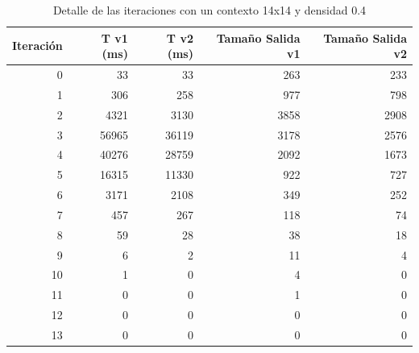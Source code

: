 	\begin{table}[h]
		\caption{Detalle de las iteraciones con un contexto 14x14 y densidad 0.4}
		\begin{center}
			\begin{tabular}{|r|r|r|r|r|}
				\hline
				Iteración  & T v1 (ms) & T v2 (ms) & Tamaño Salida v1  & Tamaño Salida v2  \\ \hline \hline
				0 & 33 & 33 & 263 & 233 \\ \hline
				1 & 306 & 258 & 977 & 798 \\ \hline
				2 & 4321 & 3130 & 3858 & 2908 \\ \hline
				3 & 56965 & 36119 & 3178 & 2576 \\ \hline
				4 & 40276 & 28759 & 2092 & 1673 \\ \hline
				5 & 16315 & 11330 & 922 & 727 \\ \hline
				6 & 3171 & 2108 & 349 & 252 \\ \hline
				7 & 457 & 267 & 118 & 74 \\ \hline
				8 & 59 & 28 & 38 & 18 \\ \hline
				9 & 6 & 2 & 11 & 4 \\ \hline
				10 & 1 & 0 & 4 & 0 \\ \hline
				11 & 0 & 0 & 1 & 0 \\ \hline
				12 & 0 & 0 & 0 & 0 \\ \hline
				13 & 0 & 0 & 0 & 0 \\ \hline
			\end{tabular}
		\end{center}
		\label{iteraciones14d4}
	\end{table}
	
